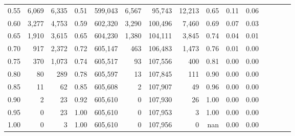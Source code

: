 \begin{tabular}{rrrcrrrrrrrrrrr}
0.55 &    6,069 &   6,335 &                                       0.51 &  599,043 &    6,567 &   95,743 &   12,213 &  0.65 &  0.11 &                         0.06 \\
0.60 &    3,277 &   4,753 &                                       0.59 &  602,320 &    3,290 &  100,496 &    7,460 &  0.69 &  0.07 &                         0.03 \\
0.65 &    1,910 &   3,615 &                                       0.65 &  604,230 &    1,380 &  104,111 &    3,845 &  0.74 &  0.04 &                         0.01 \\
0.70 &      917 &   2,372 &                                       0.72 &  605,147 &      463 &  106,483 &    1,473 &  0.76 &  0.01 &                         0.00 \\
0.75 &      370 &   1,073 &                                       0.74 &  605,517 &       93 &  107,556 &      400 &  0.81 &  0.00 &                         0.00 \\
0.80 &       80 &     289 &                                       0.78 &  605,597 &       13 &  107,845 &      111 &  0.90 &  0.00 &                         0.00 \\
0.85 &       11 &      62 &                                       0.85 &  605,608 &        2 &  107,907 &       49 &  0.96 &  0.00 &                         0.00 \\
0.90 &        2 &      23 &                                       0.92 &  605,610 &        0 &  107,930 &       26 &  1.00 &  0.00 &                         0.00 \\
0.95 &        0 &      23 &                                       1.00 &  605,610 &        0 &  107,953 &        3 &  1.00 &  0.00 &                         0.00 \\
1.00 &        0 &       3 &                                       1.00 &  605,610 &        0 &  107,956 &        0 &   nan &  0.00 &                         0.00 \\
\bottomrule
\end{tabular}
